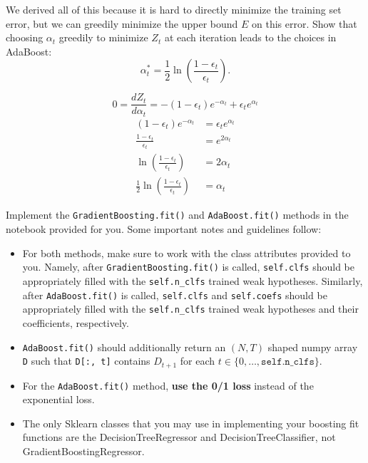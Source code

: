 \problem[2]
We derived all of this because it is hard to directly minimize the training set error, but we can greedily minimize the upper bound $E$ on this error. Show that choosing $\alpha_t$
greedily to minimize $Z_t$ at each iteration leads to the choices in
AdaBoost:
$$\alpha_{t}^* = \frac{1}{2} \ln \left(\frac{1 - \epsilon_t}{\epsilon_t} \right).$$

\begin{solution}
    $$ 0 = \frac{d Z_t}{d \alpha_t} = -(1 - \epsilon_t) e^{-\alpha_t} + \epsilon_t e^{\alpha_t} $$
    \begin{align*}
    (1 - \epsilon_t) e^{-\alpha_t} &= \epsilon_t e^{\alpha_t} \\
    \frac{1 - \epsilon_t}{\epsilon_t} &= e^{2 \alpha_t} \\
    \ln \left(\frac{1 - \epsilon_t}{\epsilon_t} \right) &= 2 \alpha_t \\
    \frac{1}{2} \ln \left(\frac{1 - \epsilon_t}{\epsilon_t} \right) &= \alpha_t
    \end{align*}
\end{solution}

\begin{problem}[14]
    Implement the \texttt{GradientBoosting.fit()} and \texttt{AdaBoost.fit()} methods in the notebook provided for you. Some important notes and guidelines follow:
    \begin{itemize}
        \item For both methods, make sure to work with the class attributes provided to you. Namely, after \texttt{GradientBoosting.fit()} is called, \texttt{self.clfs} should be appropriately filled with the \texttt{self.n_clfs} trained weak hypotheses. Similarly, after \texttt{AdaBoost.fit()} is called, \texttt{self.clfs} and \texttt{self.coefs} should be appropriately filled with the \texttt{self.n_clfs} trained weak hypotheses and their coefficients, respectively.
        \item \texttt{AdaBoost.fit()} should additionally return an $(N, T)$ shaped numpy array \texttt{D} such that \texttt{D[:, t]} contains $D_{t+1}$ for each $t \in \{0, \ldots, \texttt{self.n_clfs}\}$.
        \item For the \texttt{AdaBoost.fit()} method, \textbf{use the 0/1 loss} instead of the exponential loss.
	\item The only Sklearn classes that you may use in implementing your boosting fit functions are the DecisionTreeRegressor and DecisionTreeClassifier, not GradientBoostingRegressor.
    \end{itemize}
\end{problem}


